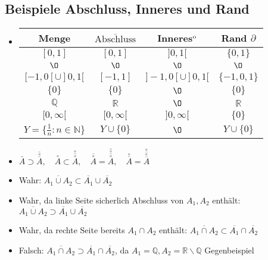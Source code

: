 \documentclass[a3paper, 11pt, landscape]{scrartcl}
\newcommand{\interior}[1]{%
  {\kern0pt#1}^{\mathrm{o}}%
}
\begin{document}
\begin{multicols*}{3}
	\subsection{Beispiele Abschluss, Inneres und Rand}
	\begin{itemize}
	    \item \begin{tabular}{|c|c|c|c|}
        	\hline
        	Menge & $\overline{\text{Abschluss}}$ & Inneres$\interior{}$ & Rand $\partial$ \\
        	\hline
        	$[0,1]$ & $[0,1]$ & $]0,1[$ & $\{0,1\}$ \\
        	\hline
        	$\O $ & $\O$ & $\O$ & $\O$ \\
        	\hline
        	$[-1,0[\cup ]0,1[ $ & $[-1,1]$ & $]-1,0[\cup]0,1[$ & $\{-1,0,1\}$ \\
        	\hline
        	$\{0\} $ & $\{0\} $ & $\O$ & $\{0\}$ \\
        	\hline
        	$\mathbb{Q} $ & $\mathbb{R} $ & $\O$ & $\mathbb{R}$ \\
        	\hline
        	$[0,\infty[ $ & $[0,\infty[ $ & $]0,\infty[$ &  $\{0\}$ \\
        	\hline
        	$Y=\{\frac{1}{n}:n\in\mathbb{N}\} $ & $Y\cup \{0\} $ & $\O$ & $Y\cup \{0\}$ \\
        	\hline
    	\end{tabular}
    	
    	\item $\bar{A} \supset \overline{\stackrel{\circ}{\overline{A}}},\quad \stackrel{\circ}{A}\subset \stackrel{\circ}{\overline{\stackrel{\circ}{A}}}, \quad \overline{\stackrel{\circ}{A}}= \bar{\stackrel{\circ}{\overline{\stackrel{\circ}{A}}}},\quad \stackrel{\circ}{\overline{A}}= {\stackrel{\circ}{\overline{\stackrel{\circ}{\overline{A}}}}}$
    	\item Wahr: $\overline{A_{1} \cup A_{2}} \subset \overline{A_{1}} \cup \overline{A_{2}}$
    	\item Wahr, da linke Seite sicherlich Abschluss von $A_1, A_2$ enthält: $\overline{A_{1} \cup A_{2}} \supset \overline{A_{1}} \cup \overline{A_{2}}$
    	\item Wahr, da rechte Seite bereits $A_1\cap A_2$ enthält: $\overline{A_{1} \cap A_{2}} \subset \overline{A_{1}} \cap \overline{A_{2}}$
    	\item Falsch: $\overline{A_{1} \cap A_{2}} \supset \overline{A_{1}} \cap \overline{A_{2}}$, da $A_1=\mathbb{Q},A_2=\mathbb{R}\backslash\mathbb{Q}$ Gegenbeispiel
	\end{itemize}

\end{multicols*}
\end{document}
